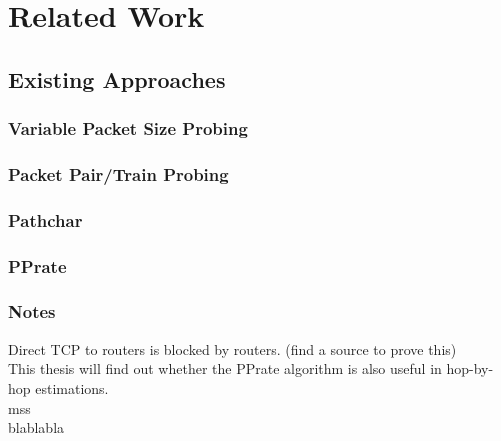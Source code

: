 \chapter{Related Work}

\section{Existing Approaches}

\subsection{Variable Packet Size Probing}

\subsection{Packet Pair/Train Probing}

\subsection{Pathchar}

\subsection{PPrate}


\subsection*{Notes}
Direct TCP to routers is blocked by routers. (find a source to prove this)\\
This thesis will find out whether the PPrate algorithm is also useful in hop-by-hop estimations.\\
\acl{mss}
\\
blablabla
